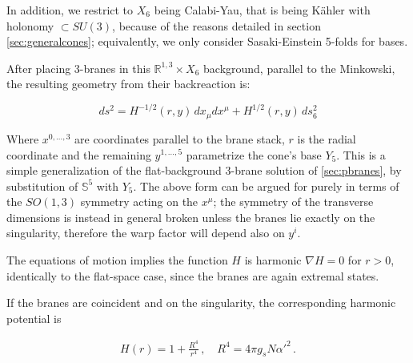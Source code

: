 In addition, we restrict to $X_6$ being Calabi-Yau, that is being K\"ahler with holonomy $\subset SU(3)$, because of the reasons detailed in section \ref{sec:generalcones}; equivalently, we only consider Sasaki-Einstein 5-folds for bases.%
%
%
%
%

After placing 3-branes in this $\mathbb{R}^{1,3} \times X_6$ background, parallel to the Minkowski, the resulting geometry from their backreaction is:

\begin{equation}
	ds^2 = H^{-1/2}(r,y) \, dx_\mu dx^\mu + H^{1/2}(r,y) \, ds_6^2 \label{warpedcone}
\end{equation}

Where $x^{0,\ldots,3}$ are coordinates parallel to the brane stack, $r$ is the radial coordinate and the remaining $y^{1,\ldots,5}$ parametrize the cone's base $Y_5$. This is a simple generalization of the flat-background 3-brane solution of \ref{sec:pbranes}, by substitution of $\mathbb{S}^5$ with $Y_5$. The above form can be argued for purely in terms of the $SO(1,3)$ symmetry acting on the $x^\mu$; the symmetry of the transverse dimensions is instead in general broken unless the branes lie exactly on the singularity, therefore the warp factor will depend also on $y^i$.

The equations of motion implies the function $H$ is harmonic $\nabla H = 0$ for $r>0$, identically to the flat-space case, since the branes are again extremal states.

If the branes are coincident and on the singularity, the corresponding harmonic potential is

\begin{align}
 H(r) = 1 + \frac{R^4}{r^4}\,,\quad R^4 = 4 \pi g_s N \alpha'^2 \,.
\end{align}

